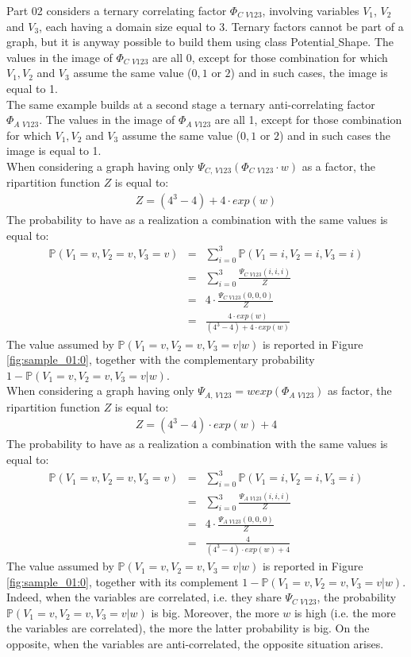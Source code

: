 Part 02 considers a ternary correlating factor $\Phi_{C\,\,V123}$, involving variables $V_1$, $V_2$ and $V_3$, each having a domain size equal to 3. Ternary factors cannot be part of a graph, but it is anyway possible to build them using class Potential$\_$Shape.
The values in the image of $\Phi_{C\,\,V123}$ are all 0, except for those combination for which $V_1,V_2$ and $V_3$ assume the same value ($0,1$ or $2$) and in such cases, the image is equal to 1.
\\
The same example builds at a second stage a ternary anti-correlating factor $\Phi_{A\,\,V123}$. The values in the image of $\Phi_{A\,\,V123}$  are all 1, except for those combination for which $V_1,V_2$ and $V_3$ assume the same value ($0,1$ or $2$) and in such cases the image is equal to 1.
\\
When considering a graph having only $\Psi_{C,\,V123}(\Phi_{C\,\,V123} \cdot w)$ as a factor, the ripartition function $Z$ is equal to:
\begin{eqnarray}
Z = (4^3 - 4) + 4 \cdot exp(w)
\end{eqnarray}
The probability to have as a realization a combination with the same values is equal to:
\begin{eqnarray}
\mathbb{P}( V_1 = v,  V_2 = v, V_3 = v ) &=& \sum _{i=0}^3 \mathbb{P}( V_1 = i,  V_2 = i, V_3 = i )  \\
&=& \sum _{i=0}^3 \frac{\Psi_{C\,\,V123}(i,i,i)}{ Z} \\
&=& 4 \cdot \frac{\Psi_{C\,\,V123}(0,0,0)}{ Z} \\
&=& \frac{4 \cdot exp(w)}{(4^3 - 4) + 4 \cdot exp(w) }
\end{eqnarray}
The value assumed by $\mathbb{P}( V_1 = v,  V_2 = v, V_3 = v | w)$  is reported in Figure \ref{fig:sample_01:0}, together with the complementary probability $1 - \mathbb{P}( V_1 = v,  V_2 = v, V_3 = v | w)$.
\\
When considering a graph having only $\Psi_{A,\,V123} = w exp( \Phi_{A\,\,V123} )$ as factor, the ripartition function $Z$ is equal to:
\begin{eqnarray}
Z = (4^3 - 4) \cdot exp(w) + 4
\end{eqnarray}
The probability to have as a realization a combination with the same values is equal to:
\begin{eqnarray}
\mathbb{P}( V_1 = v,  V_2 = v, V_3 = v ) &=& \sum _{i=0}^3 \mathbb{P}( V_1 = i,  V_2 = i, V_3 = i )  \\
&=& \sum _{i=0}^3 \frac{\Psi_{A\,\,V123}(i,i,i)}{ Z} \\
&=& 4 \cdot \frac{\Psi_{A\,\,V123}(0,0,0)}{ Z} \\
&=& \frac{4}{(4^3 - 4) \cdot exp(w) + 4 }
\end{eqnarray}
The value assumed by $\mathbb{P}( V_1 = v,  V_2 = v, V_3 = v | w)$  is reported in Figure \ref{fig:sample_01:0}, together with its complement $1 - \mathbb{P}( V_1 = v,  V_2 = v, V_3 = v | w)$.
Indeed, when the variables are correlated, i.e. they share $\Psi_{C\,\,V123}$, the probability $\mathbb{P}( V_1 = v,  V_2 = v, V_3 = v | w)$ is big. Moreover, the more $w$ is high (i.e. the more the variables are correlated), the more the latter probability is big. On the opposite, when the variables are anti-correlated, the opposite situation arises. 
